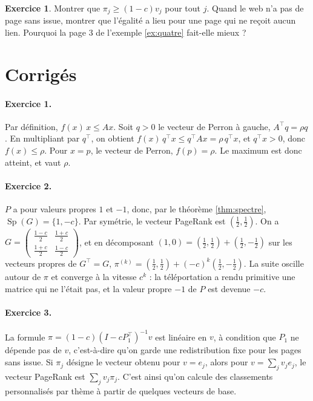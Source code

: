 \documentclass[11pt,a4paper]{article}
\theoremstyle{plain}
\theoremstyle{definition}
\newtheorem{exercice}{Exercice}
\theoremstyle{remark}
\DeclareMathOperator{\Sp}{Sp}
\begin{document}
\begin{exercice}\label{exo:monotonie}
Montrer que $\pi_j\geq(1-c)v_j$ pour tout $j$. Quand le web n'a pas de page sans issue, montrer que l'égalité a lieu pour une page qui ne reçoit aucun lien. Pourquoi la page $3$ de l'exemple \ref{ex:quatre} fait-elle mieux ?
\end{exercice}

\section{Corrigés}

\paragraph{Exercice 1.} Par définition, $f(x)\,x\leq Ax$. Soit $q>0$ le vecteur de Perron à gauche, $A^\top q=\rho q$. En multipliant par $q^\top$, on obtient $f(x)\,q^\top x\leq q^\top Ax=\rho\,q^\top x$, et $q^\top x>0$, donc $f(x)\leq\rho$. Pour $x=p$, le vecteur de Perron, $f(p)=\rho$. Le maximum est donc atteint, et vaut $\rho$.

\paragraph{Exercice 2.} $P$ a pour valeurs propres $1$ et $-1$, donc, par le théorème \ref{thm:spectre}, $\Sp(G)=\{1,-c\}$. Par symétrie, le vecteur PageRank est $(\frac12,\frac12)$. On a $G=\begin{pmatrix}\frac{1-c}2&\frac{1+c}2\\[2pt]\frac{1+c}2&\frac{1-c}2\end{pmatrix}$, et en décomposant $(1,0)=(\frac12,\frac12)+(\frac12,-\frac12)$ sur les vecteurs propres de $G^\top=G$, $\pi^{(k)}=(\frac12,\frac12)+(-c)^k(\frac12,-\frac12)$. La suite oscille autour de $\pi$ et converge à la vitesse $c^k$ : la téléportation a rendu primitive une matrice qui ne l'était pas, et la valeur propre $-1$ de $P$ est devenue $-c$.

\paragraph{Exercice 3.} La formule $\pi=(1-c)(I-cP_1^\top)^{-1}v$ est linéaire en $v$, à condition que $P_1$ ne dépende pas de $v$, c'est-à-dire qu'on garde une redistribution fixe pour les pages sans issue. Si $\pi_j$ désigne le vecteur obtenu pour $v=e_j$, alors pour $v=\sum_jv_je_j$, le vecteur PageRank est $\sum_jv_j\pi_j$. C'est ainsi qu'on calcule des classements personnalisés par thème à partir de quelques vecteurs de base.
\end{document}
